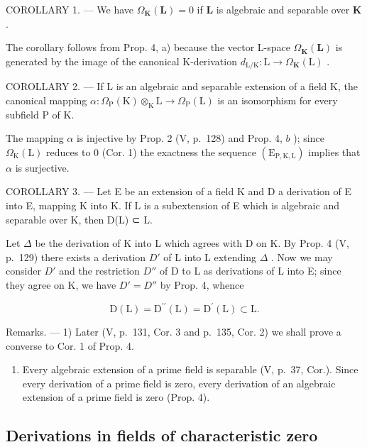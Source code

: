 COROLLARY 1. --- We have \(\Omega_{\mathbf{K}}(\mathbf{L}) = 0\) if \(\mathbf{L}\) is algebraic and separable over \(\mathbf{K}\) .

The corollary follows from Prop. 4, a) because the vector L-space \(\Omega_{\mathbf{K}}(\mathbf{L})\) is generated by the image of the canonical K-derivation \(d_{\mathrm{L / K}}: \mathrm{L} \to \Omega_{\mathbf{K}}(\mathrm{L})\) .

COROLLARY 2. --- If L is an algebraic and separable extension of a field K, the canonical mapping \(\alpha: \Omega_{\mathrm{P}}(\mathrm{K}) \otimes_{\mathrm{K}} \mathrm{L} \to \Omega_{\mathrm{P}}(\mathrm{L})\) is an isomorphism for every subfield P of K.

The mapping \(\alpha\) is injective by Prop. 2 (V, p.~128) and Prop. 4, \(b\) ); since \(\Omega_{\mathrm{K}}(\mathrm{L})\) reduces to 0 (Cor. 1) the exactness the sequence \((\mathrm{E}_{\mathrm{P},\mathrm{K},\mathrm{L}})\) implies that \(\alpha\) is surjective.

COROLLARY 3. --- Let E be an extension of a field K and D a derivation of E into E, mapping K into K. If L is a subextension of E which is algebraic and separable over K, then D(L) ⊂ L.

Let \(\Delta\) be the derivation of K into L which agrees with D on K. By Prop. 4 (V, p.~129) there exists a derivation \(D'\) of L into L extending \(\Delta\) . Now we may consider \(D'\) and the restriction \(D''\) of D to L as derivations of L into E; since they agree on K, we have \(D' = D''\) by Prop. 4, whence

\[
\mathrm{D} (\mathrm{L}) = \mathrm{D} ^ {\prime \prime} (\mathrm{L}) = \mathrm{D} ^ {\prime} (\mathrm{L}) \subset \mathrm{L}.
\]

Remarks. --- 1) Later (V, p.~131, Cor. 3 and p.~135, Cor. 2) we shall prove a converse to Cor. 1 of Prop. 4.

\begin{enumerate}
\def\labelenumi{\arabic{enumi})}
\setcounter{enumi}{1}
\tightlist
\item
  Every algebraic extension of a prime field is separable (V, p.~37, Cor.). Since every derivation of a prime field is zero, every derivation of an algebraic extension of a prime field is zero (Prop. 4).
\end{enumerate}

\subsection{Derivations in fields of characteristic zero}

